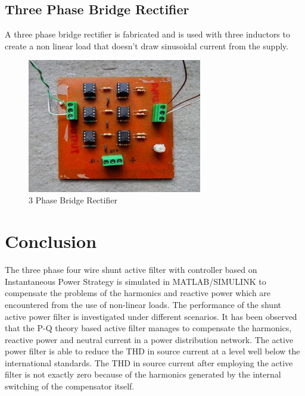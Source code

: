 \documentclass[journal,twoside]{IEEEtran}
\begin{document}
\subsection{Three Phase Bridge Rectifier}
A three phase bridge rectifier is fabricated and is used
with three inductors to create a non linear load that doesn't
draw sinusoidal current from the supply.
\begin{figure}[!ht]
\centering
\includegraphics[width=3in]{7}
\caption{3 Phase Bridge Rectifier}
\label{f7}
\end{figure}

\section{Conclusion}
The three phase four wire shunt active filter with controller
based on Instantaneous Power Strategy is simulated in
MATLAB/SIMULINK to compensate the problems of the
harmonics and reactive power which are encountered from the
use of non-linear loads. The performance of the shunt active
power filter is investigated under different scenarios. It has
been observed that the P-Q theory based active filter manages
to compensate the harmonics, reactive power and neutral
current in a power distribution network. The active power
filter is able to reduce the THD in source current at a level
well below the international standards. The THD in source
current after employing the active filter is not exactly zero
because of the harmonics generated by the internal switching
of the compensator itself.
\end{document}
